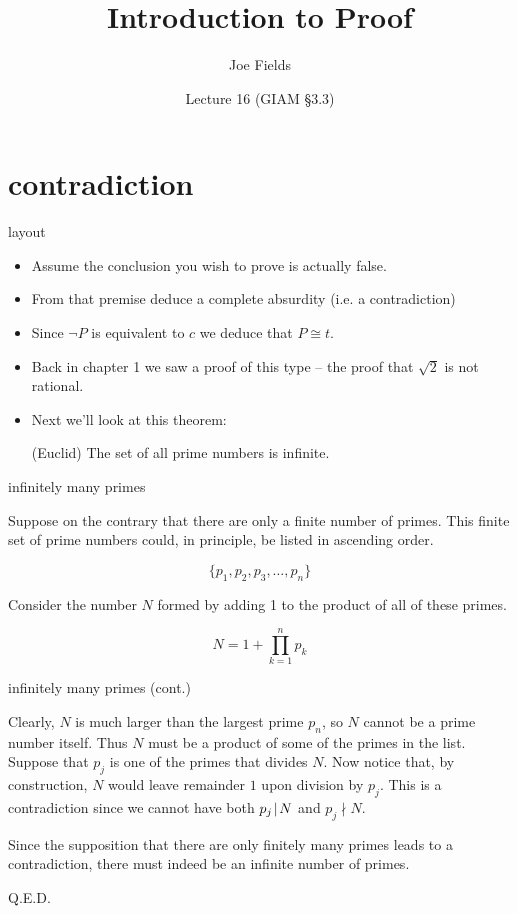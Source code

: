 \documentclass[landscape]{beamer}
\author{Joe Fields}
\title{Introduction to Proof}
\date{Lecture 16 (GIAM \S 3.3)}
\institute[SCSU]{ {\tt fieldsj1@southernct.edu} }
\begin{document}
\begin{frame}[plain]
  \titlepage
\end{frame}

\section{contradiction}

\begin{frame}{layout}
\begin{itemize}
\item  Assume the conclusion you wish to prove is actually false.\pause
\item From that premise deduce a complete absurdity (i.e. a contradiction) \pause
\item Since $\lnot P$ is equivalent to $c$ we deduce that $P \cong t$. \pause
\item Back in chapter 1 we saw a proof of this type -- the proof that $\sqrt{2}$ is not rational. \pause
\item Next we'll look at this theorem: \pause
\begin{thm} (Euclid) The set of all prime numbers is infinite.
\end{thm}
\end{itemize}
\end{frame}

\begin{frame}{infinitely many primes}


\noindent Suppose on the contrary that there are only a finite number
of primes.  This finite set of prime numbers could, in principle, be listed
in ascending order.

\[  \{ p_1, p_2, p_3, \ldots , p_n \} \]

Consider the number $N$ formed by adding 1 to the product of all of these 
primes.

\[ N = 1 + \prod_{k=1}^n p_k \]

\end{frame}

\begin{frame}{infinitely many primes (cont.)}

Clearly, $N$ is much larger than the largest prime $p_n$, so $N$ cannot
be a prime number itself.  Thus $N$ must be a product of some of the 
primes in the list.  Suppose that $p_j$ is one of the primes that 
divides $N$.  Now notice that, by construction, $N$ would leave remainder
$1$ upon division by $p_j$.  This is a contradiction since we cannot have
both $p_j \!\mid\! N$ and $p_j \nmid N$. 

Since the supposition that there are only finitely many primes leads to
a contradiction, there must indeed be an infinite number of primes.

\hspace{\fill} Q.E.D.

\end{frame}
\end{document}
